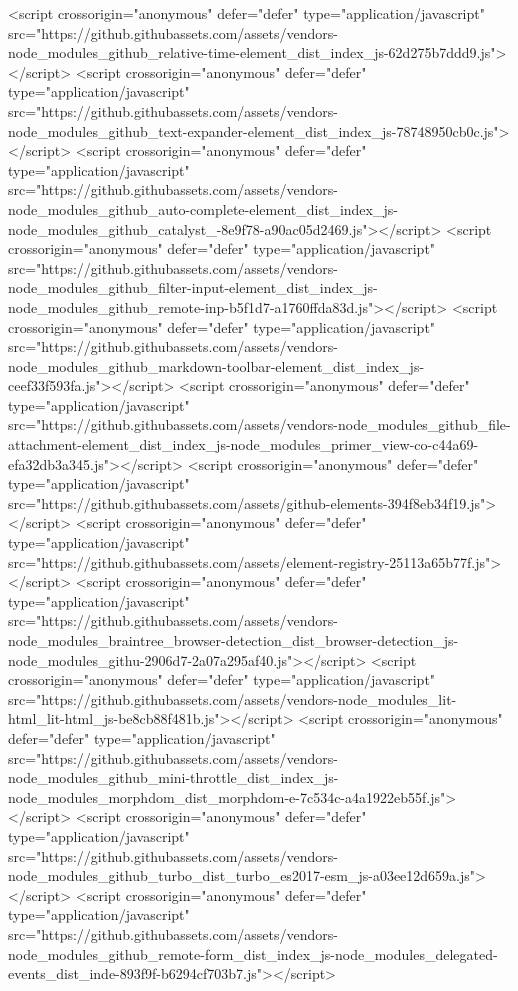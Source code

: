 <script crossorigin="anonymous" defer="defer" type="application/javascript" src="https://github.githubassets.com/assets/vendors-node_modules_github_relative-time-element_dist_index_js-62d275b7ddd9.js"></script>
<script crossorigin="anonymous" defer="defer" type="application/javascript" src="https://github.githubassets.com/assets/vendors-node_modules_github_text-expander-element_dist_index_js-78748950cb0c.js"></script>
<script crossorigin="anonymous" defer="defer" type="application/javascript" src="https://github.githubassets.com/assets/vendors-node_modules_github_auto-complete-element_dist_index_js-node_modules_github_catalyst_-8e9f78-a90ac05d2469.js"></script>
<script crossorigin="anonymous" defer="defer" type="application/javascript" src="https://github.githubassets.com/assets/vendors-node_modules_github_filter-input-element_dist_index_js-node_modules_github_remote-inp-b5f1d7-a1760ffda83d.js"></script>
<script crossorigin="anonymous" defer="defer" type="application/javascript" src="https://github.githubassets.com/assets/vendors-node_modules_github_markdown-toolbar-element_dist_index_js-ceef33f593fa.js"></script>
<script crossorigin="anonymous" defer="defer" type="application/javascript" src="https://github.githubassets.com/assets/vendors-node_modules_github_file-attachment-element_dist_index_js-node_modules_primer_view-co-c44a69-efa32db3a345.js"></script>
<script crossorigin="anonymous" defer="defer" type="application/javascript" src="https://github.githubassets.com/assets/github-elements-394f8eb34f19.js"></script>
<script crossorigin="anonymous" defer="defer" type="application/javascript" src="https://github.githubassets.com/assets/element-registry-25113a65b77f.js"></script>
<script crossorigin="anonymous" defer="defer" type="application/javascript" src="https://github.githubassets.com/assets/vendors-node_modules_braintree_browser-detection_dist_browser-detection_js-node_modules_githu-2906d7-2a07a295af40.js"></script>
<script crossorigin="anonymous" defer="defer" type="application/javascript" src="https://github.githubassets.com/assets/vendors-node_modules_lit-html_lit-html_js-be8cb88f481b.js"></script>
<script crossorigin="anonymous" defer="defer" type="application/javascript" src="https://github.githubassets.com/assets/vendors-node_modules_github_mini-throttle_dist_index_js-node_modules_morphdom_dist_morphdom-e-7c534c-a4a1922eb55f.js"></script>
<script crossorigin="anonymous" defer="defer" type="application/javascript" src="https://github.githubassets.com/assets/vendors-node_modules_github_turbo_dist_turbo_es2017-esm_js-a03ee12d659a.js"></script>
<script crossorigin="anonymous" defer="defer" type="application/javascript" src="https://github.githubassets.com/assets/vendors-node_modules_github_remote-form_dist_index_js-node_modules_delegated-events_dist_inde-893f9f-b6294cf703b7.js"></script>
